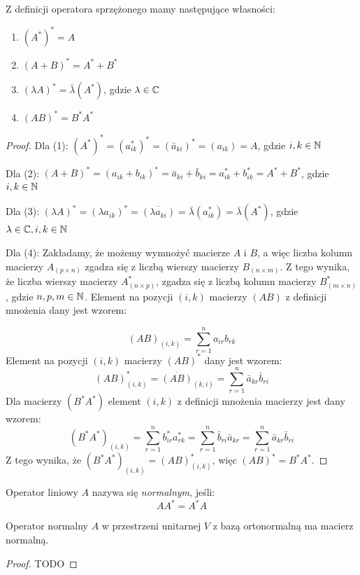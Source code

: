 \begin{theorem}\label{theorem:properties_of_conjugated_operator}
    Z definicji operatora sprzężonego mamy następujące własności:
    \begin{enumerate}[leftmargin=1cm, itemsep=2pt, label=(\arabic*)]
        \item $(A^*)^* = A$
        \item $(A + B)^* = A^* + B^*$
        \item $(\lambda A)^* = \bar{\lambda}(A^*)$, gdzie $\lambda \in \mathbb{C}$
        \item $(AB)^* = B^*A^*$
    \end{enumerate}
\end{theorem}
\begin{proof}
Dla (1): $(A^*)^* = (a^*_{ik})^* = (\bar{a}_{ki})^* = (a_{ik}) = A$, gdzie $i, k \in \mathbb{N}$

Dla (2):
$(A + B)^* = (a_{ik} + b_{ik})^* = \bar{a}_{ki} + \bar{b}_{ki} = a^*_{ik} + b^*_{ik} = A^* + B^*$, gdzie $i, k \in \mathbb{N}$

Dla (3):
$(\lambda A)^* = (\lambda a_{ik})^* = \overline{(\lambda a_{ki})} = \bar{\lambda}(a^*_{ik}) = \bar{\lambda}(A^*)$, gdzie $\lambda \in \mathbb{C}, i, k \in \mathbb{N}$

Dla (4):
Zakładamy, że możemy wymnożyć macierze $A$ i $B$, a więc liczba kolumn macierzy $A_{(p \times n)}$ zgadza się z liczbą wierszy macierzy $B_{(n \times m)}$. Z tego wynika, że liczba wierszy macierzy $A^*_{(n \times p)}$, zgadza się z liczbą kolumn macierzy $B^*_{(m \times n)}$, gdzie $n, p, m \in \mathbb{N}$.
Element na pozycji $(i, k)$ macierzy $(AB)$ z definicji mnożenia dany jest wzorem: 

$$(AB)_{(i, k)} = \sum_{r=1}^{n}{a_{ir}b_{rk}}$$
Element na pozycji $(i, k)$ macierzy $(AB)^*$ dany jest wzorem:
$$(AB)^*_{(i, k)} = \overline{(AB)}_{(k, i)} = \sum_{r=1}^{n}{\bar{a}_{kr}\bar{b}_{ri}}$$
Dla macierzy $(B^*A^*)$ element $(i, k)$ z definicji mnożenia macierzy jest dany wzorem:
$$(B^*A^*)_{(i, k)} = \sum_{r=1}^{n}{b^*_{ir}a^*_{rk}} = \sum_{r=1}^{n}{\bar{b}_{ri}\bar{a}_{kr}} = \sum_{r=1}^{n}{\bar{a}_{kr}\bar{b}_{ri}}$$
Z tego wynika, że $(B^*A^*)_{(i, k)} = (AB)^*_{(i, k)}$, więc $(AB)^* = B^*A^*$.
\end{proof}

\begin{definition}\label{def:complex_normal_operator}
Operator liniowy $A$ nazywa się \textit{normalnym}, jeśli:
$$AA^* = A^*A$$
\end{definition}
\begin{theorem}
    Operator normalny $A$ w przestrzeni unitarnej $V$ z bazą ortonormalną ma macierz normalną.
\end{theorem}
\begin{proof}
TODO
\end{proof}

